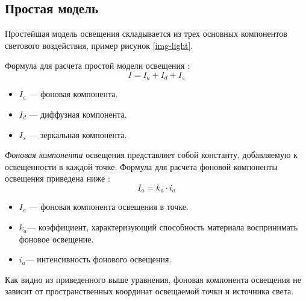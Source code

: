 \subsection{Простая модель}

Простейшая модель освещения складывается из трех основных компонентов светового воздействия, пример рисунок \ref{img-light}.


Формула для расчета простой модели освещения \cite{lightmodf}:
\begin{equation}
 I = I_{a} + I_{d} + I_{s}
\end{equation}
	
\begin{itemize}
	\item $I_{a}$ --- фоновая компонента.
	\item $I_{d}$ --- диффузная компонента.
	\item $I_{s}$ --- зеркальная компонента.
\end{itemize}

\textit{Фоновая компонента} освещения представляет собой константу, добавляемую к освещенности в каждой точке. Формула для расчета фоновой компоненты освещения приведена ниже \cite{lightmodf} : \begin{equation}
	I_{a}=k_{a} \cdot i_{a}
\end{equation}
\begin{itemize}
	\item $I_{a}$ --- фоновая компонента освещения в точке.
	\item $k_{a}$​ --- коэффициент, характеризующий способность материала воспринимать фоновое освещение.
	\item $i_{a}$​ --- интенсивность фонового освещения.
\end{itemize}

Как видно из приведенного выше уравнения, фоновая компонента освещения не зависит от пространственных координат освещаемой точки и источника света.

%
%
%
%

